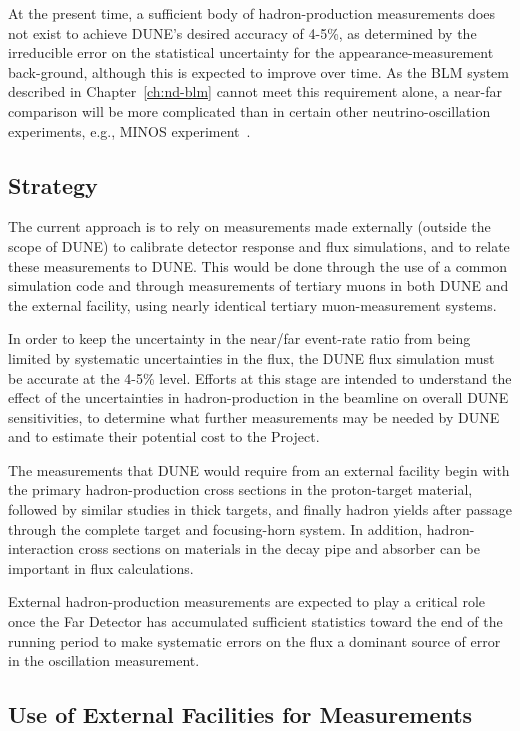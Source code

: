 At the present time, a sufficient body of hadron-production measurements does
not exist to achieve DUNE's desired accuracy of 4-5\%, as determined by the irreducible error on the statistical uncertainty for the appearance-measurement back-ground, although this is expected to improve over time. As the BLM system described in Chapter~\ref{ch:nd-blm} cannot meet this requirement alone, a near-far comparison
will be more complicated than in certain other neutrino-oscillation experiments, e.g.,
MINOS experiment~\cite{gnumi-validation}.


\subsection{Strategy}
\label{subsec:nu-meas-strat}

The current approach is to rely on measurements made externally (outside the scope
of DUNE) to calibrate detector response and flux simulations, and to relate these
measurements to DUNE. This would be done through the use of a common simulation
code and through measurements of tertiary muons in both DUNE and the external
facility, using nearly identical tertiary muon-measurement systems.

In order to keep the uncertainty in the near/far event-rate ratio from being limited
by systematic uncertainties in the flux, the DUNE flux simulation must be accurate
at the 4-5\% level. Efforts at this stage are intended to understand the effect of the
uncertainties in hadron-production in the beamline on overall DUNE sensitivities,
to determine what further measurements may be needed by DUNE and to estimate
their potential cost to the Project.

The measurements that DUNE would require from an external facility begin with
the primary hadron-production cross sections in the proton-target material, followed
by similar studies in thick targets, and finally hadron yields after passage through
the complete target and focusing-horn system. In addition, hadron-interaction cross
sections on materials in the decay pipe and absorber can be important in flux calculations.


External hadron-production measurements are expected to play
a critical role once the Far Detector has accumulated sufficient
statistics toward the end of the running period to make systematic errors
on the flux a dominant source of error in the oscillation measurement. 

\subsection{Use of External Facilities for Measurements}

